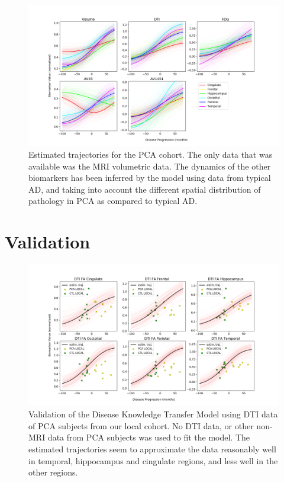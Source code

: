 \documentclass{llncs}
\begin{document}
\begin{figure}[H]
 \includegraphics[width=\textwidth, trim=0 0 0 0, clip]{figures/trajDisSpaceOverlap_PCA_tad-drcTinyPen1_JMD.png}
 \caption{Estimated trajectories for the PCA cohort. The only data that was available was the MRI volumetric data. The dynamics of the other biomarkers has been inferred by the model using data from typical AD, and taking into account the different spatial distribution of pathology in PCA as compared to typical AD.}
 \label{fig:PCAtrajByModality}
\end{figure}
% 
% 


\section*{Validation}


\begin{figure}[H]
 \includegraphics[width=\textwidth, trim=0 0 0 0, clip]{figures/validDtiPCA.png}
 \caption{Validation of the Disease Knowledge Transfer Model using DTI data of PCA subjects from our local cohort. No DTI data, or other non-MRI data from PCA subjects was used to fit the model. The estimated trajectories seem to approximate the data reasonably well in temporal, hippocampus and cingulate regions, and less well in the other regions.}
\label{fig:DTIvalid}
\end{figure}
\end{document}
